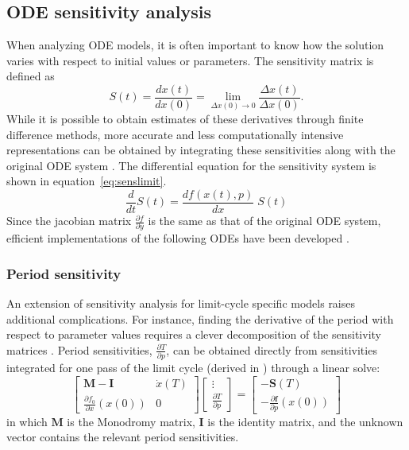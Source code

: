 \subsection{ODE sensitivity analysis}

When analyzing ODE models, it is often important to know how the solution varies with respect to initial values or parameters. 
The sensitivity matrix is defined as
\begin{equation}
  S(t) = \frac{dx(t)}{dx(0)} = \lim_{\Delta x(0) \to 0}\frac{\Delta x(t)}{\Delta x(0)}.
  \label{eq:senslimit}
\end{equation}
While it is possible to obtain estimates of these derivatives through finite difference methods, more accurate and less computationally intensive representations can be obtained by integrating these sensitivities along with the original ODE system \cite{Dickinson1976}. 
The differential equation for the sensitivity system is shown in equation~\ref{eq:senslimit}. 
\begin{equation}
  \frac{d}{dt} S(t)  = \frac{df(x(t),p)}{dx}\; S(t)
  \label{eq:odesens}
\end{equation}
Since the jacobian matrix $\frac{\partial f}{\partial y}$ is the same as that of the original ODE system, efficient implementations of the following ODEs have been developed \cite{Feehery1997}.

\subsubsection{Period sensitivity}

An extension of sensitivity analysis for limit-cycle specific models raises additional complications. 
For instance, finding the derivative of the period with respect to parameter values requires a clever decomposition of the sensitivity matrices \cite{Kramer1984}. 
Period sensitivities, $\frac{\partial T}{\partial p}$, can be obtained directly from sensitivities integrated for one pass of the limit cycle (derived in \cite{Wilkins2009}) through a linear solve:
\begin{equation}
  \left[\begin{array}{cc}
      \mathbf{M} - \mathbf{I} & \dot{x}(T) \\
      \frac{\partial f_0}{\partial x}(x(0)) & 0
  \end{array}\right]
  \left[\begin{array}{c}
      \vdots \\ \frac{\partial T}{\partial p}
  \end{array}\right] =
  \left[\begin{array}{c}
      -\mathbf{S}(T) \\ -\frac{\partial {\bm f}}{\partial p}(x(0))
  \end{array}\right]
\end{equation}
in which $\mathbf{M}$ is the Monodromy matrix, $\mathbf{I}$ is the identity matrix, and the unknown vector contains the relevant period sensitivities.

